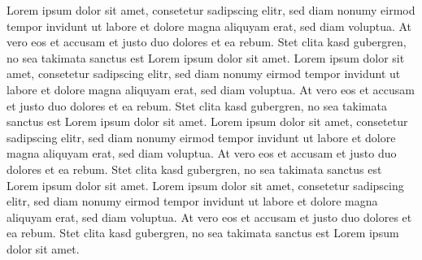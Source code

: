 \documentclass[11pt, a4paper]{article}
\begin{document}
Lorem ipsum dolor sit amet, consetetur sadipscing elitr, sed diam nonumy eirmod tempor invidunt ut labore et dolore magna aliquyam erat, sed diam voluptua. At vero eos et accusam et justo duo dolores et ea rebum. Stet clita kasd gubergren, no sea takimata sanctus est Lorem ipsum dolor sit amet. Lorem ipsum dolor sit amet, consetetur sadipscing elitr, sed diam nonumy eirmod tempor invidunt ut labore et dolore magna aliquyam erat, sed diam voluptua. At vero eos et accusam et justo duo dolores et ea rebum. Stet clita kasd gubergren, no sea takimata sanctus est Lorem ipsum dolor sit amet. Lorem ipsum dolor sit amet, consetetur sadipscing elitr, sed diam nonumy eirmod tempor invidunt ut labore et dolore magna aliquyam erat, sed diam voluptua. At vero eos et accusam et justo duo dolores et ea rebum. Stet clita kasd gubergren, no sea takimata sanctus est Lorem ipsum dolor sit amet. Lorem ipsum dolor sit amet, consetetur sadipscing elitr, sed diam nonumy eirmod tempor invidunt ut labore et dolore magna aliquyam erat, sed diam voluptua. At vero eos et accusam et justo duo dolores et ea rebum. Stet clita kasd gubergren, no sea takimata sanctus est Lorem ipsum dolor sit amet.\\



\newpage
{}	%

\listoffigures


\end{document}
